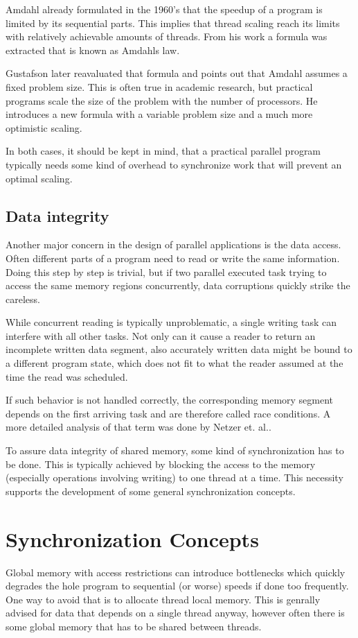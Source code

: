 Amdahl already formulated in the 1960's\cite{amdahl1967validity} that the speedup of a program is limited by its sequential parts. This implies that thread scaling reach its limits with relatively achievable amounts of threads. From his work a formula was extracted that is known as Amdahls law. 

Gustafson later reavaluated that formula\cite{gustafson1988reevaluating} and points out that Amdahl assumes a fixed problem size. This is often true in academic research, but practical programs scale the size of the problem with the number of processors. He introduces a new formula with a variable problem size and a much more optimistic scaling.

In both cases, it should be kept in mind, that a practical parallel program typically needs some kind of overhead to synchronize work that will prevent an optimal scaling. 

\subsection{Data integrity}
Another major concern in the design of parallel applications is the data access. Often different parts of a program need to read or write the same information. Doing this step by step is trivial, but if two parallel executed task trying to access the same memory regions concurrently, data corruptions quickly strike the careless.

While concurrent reading is typically unproblematic, a single writing task can interfere with all other tasks. Not only can it cause a reader to return an incomplete written data segment, also accurately written data might be bound to a different program state, which does not fit to what the reader assumed at the time the read was scheduled.

If such behavior is not handled correctly, the corresponding memory segment depends on the first arriving task and are therefore called race conditions. A more detailed analysis of that term was done by Netzer et. al.\cite{netzer1992race}.

To assure data integrity of shared memory, some kind of synchronization has to be done. This is typically achieved by blocking the access to the memory (especially operations involving writing) to one thread at a time. This necessity supports the development of some general synchronization concepts.

\section{Synchronization Concepts}
Global memory with access restrictions can introduce bottlenecks which quickly degrades the hole program to sequential (or worse) speeds if done too frequently. One way to avoid that is to allocate thread local memory. This is genrally advised for data that depends on a single thread anyway, however often there is some global memory that has to be shared between threads.


